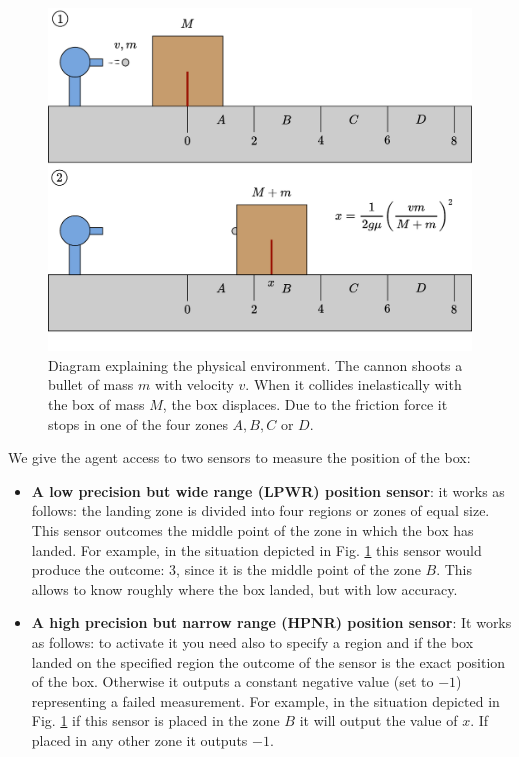 \documentclass[11pt,a4paper,twoside]{report}
\newcommand{\+}{\textnormal{+} }
\theoremstyle{definition}
\numberwithin{equation}{chapter}
\begin{document}
\begin{figure}[t]
  \centering
  \includegraphics[scale=0.5]{figures/Experiment2.pdf}
  \caption{Diagram explaining the physical environment. The cannon shoots a 
  bullet of mass $m$ with velocity $v$. When it collides inelastically with the 
  box of mass $M$, the box displaces. Due to the friction force it stops in
  one of the four zones $A, B, C$ or $D$.}
  \label{fig:Box}
\end{figure}

We give the agent access to two sensors to measure the position of the box:
\begin{itemize}
\item \textbf{A low precision but wide range (LPWR) position  sensor}: it works
as follows: the landing zone is divided into four regions or zones of equal size.
This sensor outcomes the middle point of the zone in which the box has landed.
For example, in the situation depicted in Fig. \ref{fig:Box} this sensor would
produce the outcome: $3$, since it is the middle point of the zone $B$. This
allows to know roughly where the box landed, but with low accuracy. 
\item \textbf{A high precision but narrow range (HPNR) position sensor}: It
works as follows: to activate it you need also to specify a region and if the box
landed on the specified region the outcome of the sensor is the exact position
of the box. Otherwise it outputs a constant negative value (set to $-1$)
representing a failed measurement. For example, in the situation depicted in
Fig. \ref{fig:Box} if this sensor is placed in the zone $B$ it will output the
value of $x$. If placed in any other zone it outputs $-1$.
\end{itemize}
\end{document}
